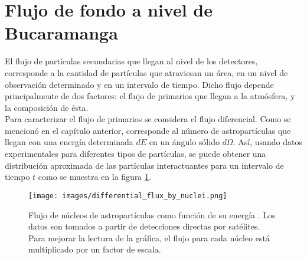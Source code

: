 
\section{Flujo de fondo a nivel de Bucaramanga}

El flujo de partículas secundarias que llegan al nivel de los detectores, corresponde a la cantidad de partículas que atraviesan un área, en un nivel de observación determinado y en un intervalo de tiempo. Dicho flujo depende principalmente de dos factores: el flujo de primarios que llegan a la atmósfera, y la composición de ésta.\\

Para caracterizar el flujo de primarios se considera el flujo diferencial. Como se mencionó en el capítulo anterior, corresponde al n\'umero de astropartículas que llegan con una energía determinada $dE$ en un ángulo sólido $d\Omega$. Así, usando datos experimentales para diferentes tipos de partículas,  se puede obtener una distribución aproximada de las partículas interactuantes para un intervalo de tiempo $t$ como se muestra en la figura \ref{fig:fig8}. \\
\begin{figure}[htb!]
\centering
\texttt{[image: images/differential\_flux\_by\_nuclei.png]}
\caption[Flujo de astropartículas como función de su energía.]{Flujo de núcleos de astropartículas como función de su energía \cite{mauro:oxigen}. Los datos son tomados a partir de detecciones directas por satélites. Para mejorar la lectura de la gráfica, el flujo para cada núcleo está multiplicado por un factor de escala.}
 \label{fig:fig8}
\end{figure}

\newpage



